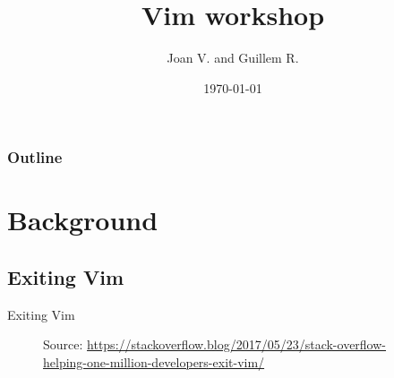\documentclass{beamer}
\title[Vim workshop]{Vim workshop}
\author{Joan V. and Guillem R.}
\institute[LinuxUPC]
{
  LinuxUPC \\
  \medskip
  \textit{linuxupc AT linuxupc.upc.edu} 
}
\date{\today}
\begin{document}
\begin{frame}
  \titlepage
\end{frame}

\begin{frame}
  \frametitle{Outline} 
  \tableofcontents 
\end{frame}

\section{Background}
\subsection{Exiting Vim}
\begin{frame}{Exiting Vim}
\begin{figure}[htp] 
    \centering
    \hfill%
        \caption{Source: \url{https://stackoverflow.blog/2017/05/23/stack-overflow-helping-one-million-developers-exit-vim/}}
    \end{figure}
\end{frame}
\end{document}
